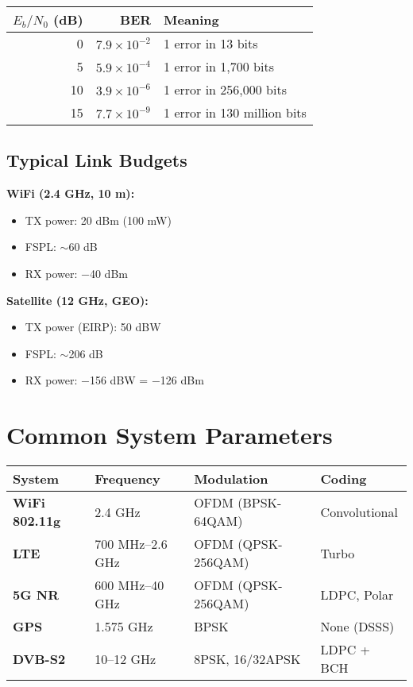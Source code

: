 \begin{center}
\begin{tabular}{@{}rrl@{}}
\toprule
$E_b/N_0$ (dB) & BER & Meaning \\
\midrule
0 & $7.9 \times 10^{-2}$ & 1 error in 13 bits \\
5 & $5.9 \times 10^{-4}$ & 1 error in 1,700 bits \\
10 & $3.9 \times 10^{-6}$ & 1 error in 256,000 bits \\
15 & $7.7 \times 10^{-9}$ & 1 error in 130 million bits \\
\bottomrule
\end{tabular}
\end{center}

\subsection{Typical Link Budgets}

\textbf{WiFi (2.4 GHz, 10 m):}
\begin{itemize}
\item TX power: 20 dBm (100 mW)
\item FSPL: $\sim$60 dB
\item RX power: $-$40 dBm
\end{itemize}

\textbf{Satellite (12 GHz, GEO):}
\begin{itemize}
\item TX power (EIRP): 50 dBW
\item FSPL: $\sim$206 dB
\item RX power: $-$156 dBW = $-$126 dBm
\end{itemize}

\section{Common System Parameters}
\label{sec:common-systems}

\begin{center}
\begin{tabular}{@{}llll@{}}
\toprule
System & Frequency & Modulation & Coding \\
\midrule
\textbf{WiFi 802.11g} & 2.4 GHz & OFDM (BPSK-64QAM) & Convolutional \\
\textbf{LTE} & 700 MHz--2.6 GHz & OFDM (QPSK-256QAM) & Turbo \\
\textbf{5G NR} & 600 MHz--40 GHz & OFDM (QPSK-256QAM) & LDPC, Polar \\
\textbf{GPS} & 1.575 GHz & BPSK & None (DSSS) \\
\textbf{DVB-S2} & 10--12 GHz & 8PSK, 16/32APSK & LDPC + BCH \\
\bottomrule
\end{tabular}
\end{center}


